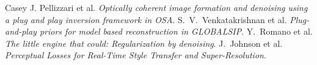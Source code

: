 \documentclass[a4paper, 11pt]{article}
\begin{document}
\begin{thebibliography}{9}
 Casey J. Pellizzari et al. \emph{Optically coherent image formation and denoising using a plug and play inversion framework in OSA}.
 S.~V.~Venkatakrishnan et al. \emph{Plug-and-play priors for model based reconstruction in GLOBALSIP}.
 Y.~Romano et al. \emph{The little engine that could: Regularization by denoising}.
 J.~Johnson et al. \emph{Perceptual Losses for Real-Time Style Transfer and Super-Resolution}.
\end{thebibliography}
\end{document}
